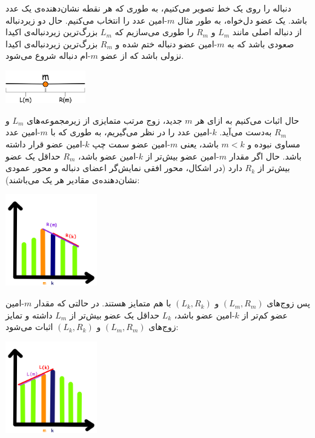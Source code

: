     \p
    دنباله را روی یک خط تصویر می‌کنیم، به طوری که هر نقطه نشان‌دهنده‌ی یک عدد باشد. یک عضو دل‌خواه، به طور مثال $m$-امین عدد را انتخاب می‌کنیم.
    حال دو زیردنباله از دنباله اصلی مانند
    $L_m$
    و
    $R_m$
   را طوری می‌سازیم که 
    $L_m$
   بزرگ‌ترین زیر‌دنباله‌ی اکیدا صعودی باشد که به $m$-امین عضو دنباله ختم شده و 
   $R_m$
   بزرگ‌ترین زیر‌دنباله‌ی اکیدا نزولی باشد که از عضو $m$-ام دنباله شروع می‌شود. 
\begin{center}
    \includegraphics[width=3.5cm]{1.png}
\end{center}
\p
   حال اثبات می‌کنیم به ازای هر
     $m$
     جدید، زوج مرتب متمایزی از زیرمجموعه‌های
     $L_m$
     و
     $R_m$
      به‌دست می‌آید. $k$-امین عدد را در نظر می‌گیریم، به طوری که با $m$-امین عدد مساوی نبوده و
      $m < k$ 
      باشد، یعنی $m$-امین عضو سمت چپ $k$-امین عضو
      قرار داشته باشد. حال اگر مقدار $m$-امین عضو بیش‌تر از $k$-امین عضو باشد، 
      $R_m$
      حداقل یک عضو بیش‌تر از
      $R_k$
      دارد (در اشکال، محور افقی نمایش‌گر اعضای دنباله و محور عمودی نشان‌دهنده‌ی مقادیر هر یک می‌باشند): 
\begin{center}
    \includegraphics[height=4cm]{2.png}
\end{center}
\p
      پس زوج‌های
    $(L_{m}, R_{m})$
    و
    $(L_{k}, R_{k})$
با هم متمایز هستند. در حالتی که مقدار $m$-امین عضو کم‌تر از $k$-امین عضو باشد،
   $L_k$
      حداقل یک عضو بیش‌تر از
      $L_m$
      داشته و تمایز زوج‌های
    $(L_{m}, R_{m})$
    و
    $(L_{k}, R_{k})$
اثبات می‌شود:
\begin{center}
    \includegraphics[height=4cm]{3.png}
\end{center}
